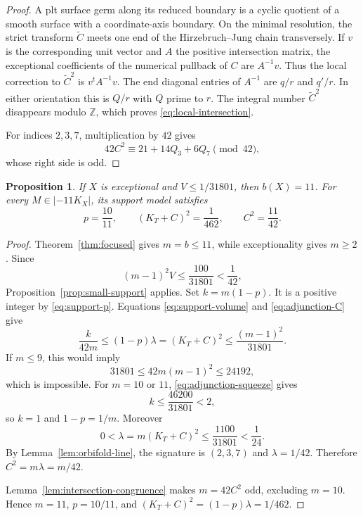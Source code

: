 \documentclass[12pt,a4paper]{article}
\numberwithin{equation}{section}
\newtheorem{proposition}[theorem]{Proposition}
\theoremstyle{definition}
\newcommand{\Z}{\mathbb Z}
\begin{document}
\begin{proof}
A plt surface germ along its reduced boundary is a cyclic quotient
of a smooth surface with a coordinate-axis boundary.
On the minimal resolution, the strict transform \(\widetilde C\)
meets one end of the Hirzebruch--Jung chain transversely.
If \(v\) is the corresponding unit vector and \(A\) the positive
intersection matrix, the exceptional coefficients of the numerical
pullback of \(C\) are \(A^{-1}v\).
Thus the local correction to \(\widetilde C^2\) is
\(v^tA^{-1}v\).
The end diagonal entries of \(A^{-1}\) are \(q/r\) and \(q'/r\).
In either orientation this is \(Q/r\) with \(Q\) prime to \(r\).
The integral number \(\widetilde C^2\) disappears modulo \(\Z\),
which proves \eqref{eq:local-intersection}.

For indices \(2,3,7\), multiplication by \(42\) gives
\[
       42C^2\equiv21+14Q_3+6Q_7\pmod{42},
\]
whose right side is odd.
\end{proof}

\begin{proposition}\label{prop:degree-eleven}
If \(X\) is exceptional and \(V\leq1/31801\), then \(b(X)=11\).
For every \(M\in|-11K_X|\), its support model satisfies
\[
                  p=\frac{10}{11},\qquad
                  (K_T+C)^2=\frac1{462},\qquad
                  C^2=\frac{11}{42}.
\]
\end{proposition}

\begin{proof}
Theorem~\ref{thm:focused} gives \(m=b\leq11\), while
exceptionality gives \(m\geq2\).
Since
\[
             (m-1)^2V\leq\frac{100}{31801}<\frac1{42},
\]
Proposition~\ref{prop:small-support} applies.
Set \(k=m(1-p)\). It is a positive integer by
\eqref{eq:support-p}. Equations
\eqref{eq:support-volume} and \eqref{eq:adjunction-C} give
\begin{equation}\label{eq:adjunction-squeeze}
       \frac{k}{42m}\leq(1-p)\lambda=(K_T+C)^2
                      \leq\frac{(m-1)^2}{31801}.
\end{equation}
If \(m\leq9\), this would imply
\[
                  31801\leq42m(m-1)^2\leq24192,
\]
which is impossible.
For \(m=10\) or \(11\), \eqref{eq:adjunction-squeeze} gives
\[
                     k\leq\frac{46200}{31801}<2,
\]
so \(k=1\) and \(1-p=1/m\).
Moreover
\[
             0<\lambda=m(K_T+C)^2
                     \leq\frac{1100}{31801}<\frac1{24}.
\]
By Lemma~\ref{lem:orbifold-line}, the signature is \((2,3,7)\)
and \(\lambda=1/42\).
Therefore \(C^2=m\lambda=m/42\).

Lemma~\ref{lem:intersection-congruence} makes \(m=42C^2\) odd,
excluding \(m=10\).
Hence \(m=11\), \(p=10/11\), and
\((K_T+C)^2=(1-p)\lambda=1/462\).
\end{proof}
\end{document}
